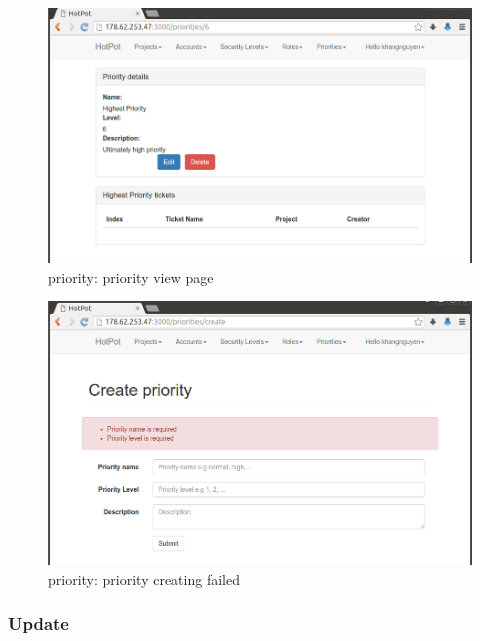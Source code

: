 \begin{figure}[bth]
\myfloatalign
\includegraphics[width=1.0\linewidth]{gfx/chapter_5/priority/priority_view}
\caption[priority: priority view page]{priority: priority view page}
\label{fig:user_guide:priority:priority_view}
\end{figure}

\begin{figure}[bth]
\myfloatalign
\includegraphics[width=1.0\linewidth]{gfx/chapter_5/priority/priority_create_failed}
\caption[priority: priority create]{priority: priority creating failed}
\label{fig:user_guide:priority:priority_create_failed}
\end{figure}

\clearpage

\subsubsection{Update}
\label{ch:appendix-a:user_guide:priority:update}

